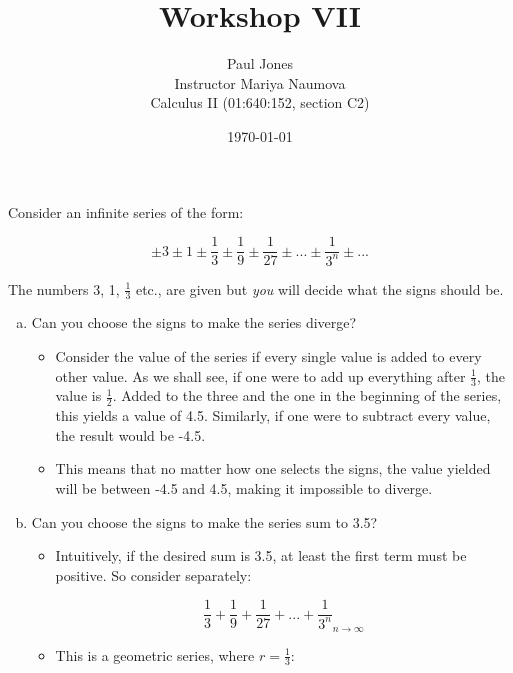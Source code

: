 \documentclass[11pt]{article}
\title{Workshop VII}
\author{Paul Jones \\
		Instructor Mariya Naumova\\
		Calculus II (01:640:152, section C2)}
\date{\today}
\begin{document}
\maketitle

\pagebreak

Consider an infinite series of the form:

\begin{equation*}
\pm 3 \pm 1 \pm \frac{1}{3} \pm \frac{1}{9} \pm \frac{1}{27} \pm ... \pm \frac{1}{3^n} \pm ...
\end{equation*}

The numbers 3, 1, $\frac{1}{3}$ etc., are given but \emph{you} will decide what the signs should be.

\begin{enumerate}[a)]

\item Can you choose the signs to make the series diverge?

\begin{itemize}

	\item Consider the value of the series if every single value is added to every other value.
	As we shall see, if one were to add up everything after $\frac{1}{3}$, the value is $\frac{1}{2}$.
	Added to the three and the one in the beginning of the series, this yields a value of 4.5.
	Similarly, if one were to subtract every value, the result would be -4.5.
	
	\item This means that no matter how one selects the signs, the value yielded will be between -4.5 and 4.5,
	making it impossible to diverge.

\end{itemize}

\item Can you choose the signs to make the series sum to 3.5?

\begin{itemize}

	\item Intuitively, if the desired sum is 3.5, at least the first term must be positive.
	So consider separately:
	
	\begin{equation*}
	\left.\frac{1}{3} + \frac{1}{9} + \frac{1}{27} + ... + \frac{1}{3^n}\right._{n \to \infty}
	\end{equation*}
	
	\item This is a geometric series, where $r = \frac{1}{3}$:
	

\end{itemize}
\end{enumerate}
\end{document}
